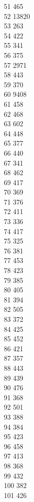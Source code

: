 { 51	465 \\
 52	13820 \\
 53	263 \\
 54	422 \\
 55	341 \\
 56	375 \\
 57	2971 \\
 58	443 \\
 59	370 \\
 60	9408 \\
 61	458 \\
 62	468 \\
 63	602 \\
 64	448 \\
 65	377 \\
 66	440 \\
 67	341 \\
 68	462 \\
 69	417 \\
 70	369 \\
 71	376 \\
 72	411 \\
 73	336 \\
 74	417 \\
 75	325 \\
 76	381 \\
 77	453 \\
 78	423 \\
 79	385 \\
 80	405 \\
 81	394 \\
 82	505 \\
 83	372 \\
 84	425 \\
 85	452 \\
 86	421 \\
 87	357 \\
 88	443 \\
 89	439 \\
 90	476 \\
 91	368 \\
 92	501 \\
 93	388 \\
 94	384 \\
 95	423 \\
 96	458 \\
 97	413 \\
 98	368 \\
 99	432 \\
 100	382 \\
 101	426 \\
}
